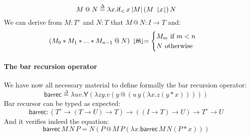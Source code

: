 \documentclass{CSML}
\makeatletter
\renewcommand{\ldots}{...}
\newcommand*\Def{\mathrel{\overset{\Delta}{=}}}
\newcommand*\LmSortTo\to
\newcommand*\LmSortA{T}
\newcommand*\LmSortB{U}
\newcommand*\LmTerm[2]{#1\mathrel{:}#2}
\newcommand*\LmTermA{M}
\newcommand*\LmTermB{N}
\newcommand*\LmTermC{P}
\newcommand*\LmVarA{x}
\newcommand*\LmVarB{y}
\newcommand*\LmVarC{z}
\newcommand*\LmVarD{u}
\newcommand*\LmVarE{v}
\newcommand*\LmConst[1]{\mathsf{#1}}
\newcommand*\CASortList[1]{{#1}^\diamond}
\newcommand*\CALmn[1]{\LmConst{\overline{#1}}}
\newcommand*\CALmnSort{I}
\newcommand*\CALmfix{\LmConst{Y}}
\newcommand*\CALmbarrec{\LmConst{barrec}}
\newcommand*\CALmbarrecSort[2]{\left(\CASortList{#1}\LmSortTo\left(#1\LmSortTo#2\right)\LmSortTo#1\right)\LmSortTo\left(\left(\CALmnSort\LmSortTo#1\right)\LmSortTo#2\right)\LmSortTo\CASortList{#1}\LmSortTo#2}
\newcommand*\CALmifl{\LmConst{if_<}}
\newcommand*\CALmconcat{\mathbin{@}}
\newcommand*\CALmextend{\mathbin{*}}
\newcommand*\CALmlen[1]{\left|#1\right|}
\newcommand*\CALmind[2]{#1\,\downharpoonright\mkern-5mu#2\mkern-5mu\downharpoonleft}
\makeatother
\begin{document}
$$\LmTermA\CALmconcat\LmTermB\Def\lambda\LmVarA.\CALmifl\,\LmVarA\CALmlen{\LmTermA}\left(\CALmind{\LmTermA}{\LmVarA}\right)\LmTermB$$
We can derive from $\LmTerm{\LmTermA}\CASortList{\LmSortA}$ and $\LmTerm{\LmTermB}{\LmSortA}$ that $\LmTerm{\LmTermA\CALmconcat\LmTermB}{\CALmnSort\LmSortTo\LmSortA}$ and:
$$\CALmind{\left(\LmTermA_0\CALmextend\LmTermA_1\CALmextend\ldots\CALmextend\LmTermA_{n-1}\CALmconcat\LmTermB\right)}{\CALmn{m}}=\begin{cases}\LmTermA_m\text{ if }m<n\\\LmTermB\text{ otherwise}\end{cases}$$
\paragraph{The bar recursion operator}
\label{barrec}
We have now all necessary material to define formally the bar recursion operator:
$$\CALmbarrec\Def\lambda\LmVarD\LmVarE.\CALmfix\left(\lambda\LmVarC\LmVarB.\LmVarE\left(\LmVarB\CALmconcat\left(\LmVarD\,\LmVarB\left(\lambda\LmVarA.\LmVarC\left(\LmVarB\CALmextend\LmVarA\right)\right)\right)\right)\right)$$
Bar recursor can be typed as expected:
$$\LmTerm{\CALmbarrec}{\CALmbarrecSort{\LmSortA}{\LmSortB}}$$
And it verifies indeed the equation:
$$\CALmbarrec\,\LmTermA\,\LmTermB\,\LmTermC=\LmTermB\left(\LmTermC\CALmconcat\LmTermA\,\LmTermC\left(\lambda\LmVarA.\CALmbarrec\,\LmTermA\,\LmTermB\left(\LmTermC\CALmextend\LmVarA\right)\right)\right)$$
\end{document}
